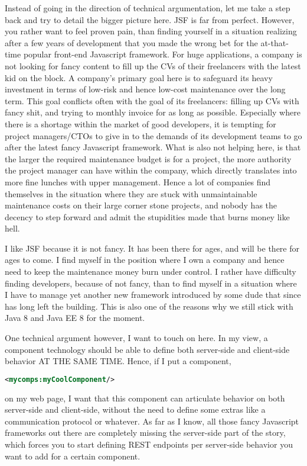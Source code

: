 Instead of going in the direction of technical argumentation, let me take a step back and try to detail the bigger picture here.
JSF is far from perfect.
However, you rather want to feel proven pain, than finding yourself in a situation realizing after a few years of development that you made the wrong bet for the at-that-time popular front-end Javascript framework.
For huge applications, a company is not looking for fancy content to fill up the CVs of their freelancers with the latest kid on the block.
A company's primary goal here is to safeguard its heavy investment in terms of low-risk and hence low-cost maintenance over the long term.
This goal conflicts often with the goal of its freelancers: filling up CVs with fancy shit, and trying to monthly invoice for as long as possible.
Especially where there is a shortage within the market of good developers,
it is tempting for project managers/CTOs to give in to the demands of its development teams to go after the latest fancy Javascript framework.
What is also not helping here, is that the larger the required maintenance budget is for a project,
the more authority the project manager can have within the company,
which directly translates into more fine lunches with upper management.
Hence a lot of companies find themselves in the situation where they are stuck with unmaintainable maintenance costs on their large corner stone projects, and nobody has the decency to step forward and admit the stupidities made that burns money like hell.

I like JSF because it is not fancy.
It has been there for ages, and will be there for ages to come.
I find myself in the position where I own a company and hence need to keep the maintenance money burn under control.
I rather have difficulty finding developers, because of not fancy, than to find myself in a situation where I have to manage yet another new framework introduced by some dude that since has long left the building.
This is also one of the reasons why we still stick with Java 8 \cite{GoslingJoyEtAl14} and Java EE 8 \cite{JavaEE8} for the moment.

One technical argument however, I want to touch on here.
In my view, a component technology should be able to define both server-side and client-side behavior AT THE SAME TIME.
Hence, if I put a component,
\begin{lstlisting}[language=XML]
	<mycomps:myCoolComponent/>
\end{lstlisting}
on my web page, I want that this component can articulate behavior on both server-side and client-side, without the need to define some extras like a communication protocol or whatever.
As far as I know, all those fancy Javascript frameworks out there are completely missing the server-side part of the story, which forces you to start defining REST endpoints per server-side behavior you want to add for a certain component.

